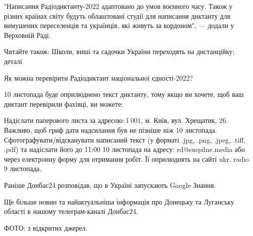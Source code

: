 "Написання Радіодиктанту-2022 адаптовано до умов воєнного часу. Також у різних
країнах світу будуть облаштовані студії для написання диктанту для вимушених
переселенців та українців, які живуть за кордоном", — додали у Верховній Раді.

Читайте також: Школи, виші та садочки України переходять на дистанційку: деталі

Як можна перевірити Радіодиктант національної єдності-2022?

10 листопада буде оприлюднено текст диктанту, тому якщо ви хочете, щоб ваш диктант перевірили фахівці, ви можете:

Надіслати паперового листа за адресою: 1 001, м. Київ, вул. Хрещатик, 26.  Важливо, щоб гриф дати надсилання був не пізніше ніж 10 листопада.
Сфотографувати/відсканувати написаний текст (у форматі .jpg, .png, .jpeg, .tiff, .pdf) та надіслати його до 11:00 10 листопада на адресу: rd@suspilne.media або через електронну форму для отримання робіт. Її оприлюднять на сайті ukr. radio 9 листопада.

Раніше Донбас24 розповідав, що в Україні запускають Google Знання.

Ще більше новин та найактуальніша інформація про Донецьку та Луганську області в нашому телеграм-каналі Донбас24.

ФОТО: з відкритих джерел.
